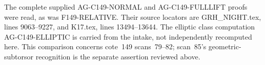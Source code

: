 The complete supplied AG-C149-NORMAL and AG-C149-FULLLIFT
proofs were read, as was F149-RELATIVE. Their source
locators are GRH\_NIGHT.tex, lines 9063--9227, and
K17.tex, lines 13494--13644. The elliptic class computation
AG-C149-ELLIPTIC is carried from the intake, not
independently recomputed here. This comparison concerns
cote~149 scans~79--82; scan~85's geometric-subtorsor
recognition is the separate assertion reviewed above.

